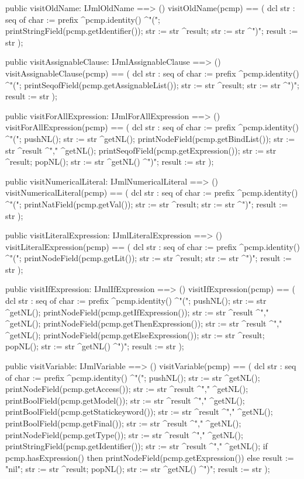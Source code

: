 \begin{vdm_al}
  public visitOldName: IJmlOldName ==> ()
  visitOldName(pcmp) ==
    ( dcl str : seq of char := prefix ^pcmp.identity() ^"(";
      printStringField(pcmp.getIdentifier());
      str := str ^result;
      str := str ^")";
      result := str );

  public visitAssignableClause: IJmlAssignableClause ==> ()
  visitAssignableClause(pcmp) ==
    ( dcl str : seq of char := prefix ^pcmp.identity() ^"(";
      printSeqofField(pcmp.getAssignableList());
      str := str ^result;
      str := str ^")";
      result := str );

  public visitForAllExpression: IJmlForAllExpression ==> ()
  visitForAllExpression(pcmp) ==
    ( dcl str : seq of char := prefix ^pcmp.identity() ^"(";
      pushNL();
      str := str ^getNL();
      printNodeField(pcmp.getBindList());
      str := str ^result ^"," ^getNL();
      printSeqofField(pcmp.getExpression());
      str := str ^result;
      popNL();
      str := str ^getNL() ^")";
      result := str );

  public visitNumericalLiteral: IJmlNumericalLiteral ==> ()
  visitNumericalLiteral(pcmp) ==
    ( dcl str : seq of char := prefix ^pcmp.identity() ^"(";
      printNatField(pcmp.getVal());
      str := str ^result;
      str := str ^")";
      result := str );

  public visitLiteralExpression: IJmlLiteralExpression ==> ()
  visitLiteralExpression(pcmp) ==
    ( dcl str : seq of char := prefix ^pcmp.identity() ^"(";
      printNodeField(pcmp.getLit());
      str := str ^result;
      str := str ^")";
      result := str );

  public visitIfExpression: IJmlIfExpression ==> ()
  visitIfExpression(pcmp) ==
    ( dcl str : seq of char := prefix ^pcmp.identity() ^"(";
      pushNL();
      str := str ^getNL();
      printNodeField(pcmp.getIfExpression());
      str := str ^result ^"," ^getNL();
      printNodeField(pcmp.getThenExpression());
      str := str ^result ^"," ^getNL();
      printNodeField(pcmp.getElseExpression());
      str := str ^result;
      popNL();
      str := str ^getNL() ^")";
      result := str );

  public visitVariable: IJmlVariable ==> ()
  visitVariable(pcmp) ==
    ( dcl str : seq of char := prefix ^pcmp.identity() ^"(";
      pushNL();
      str := str ^getNL();
      printNodeField(pcmp.getAccess());
      str := str ^result ^"," ^getNL();
      printBoolField(pcmp.getModel());
      str := str ^result ^"," ^getNL();
      printBoolField(pcmp.getStatickeyword());
      str := str ^result ^"," ^getNL();
      printBoolField(pcmp.getFinal());
      str := str ^result ^"," ^getNL();
      printNodeField(pcmp.getType());
      str := str ^result ^"," ^getNL();
      printStringField(pcmp.getIdentifier());
      str := str ^result ^"," ^getNL();
      if pcmp.hasExpression()
      then printNodeField(pcmp.getExpression())
      else result := "nil";
      str := str ^result;
      popNL();
      str := str ^getNL() ^")";
      result := str );


\end{vdm_al}
